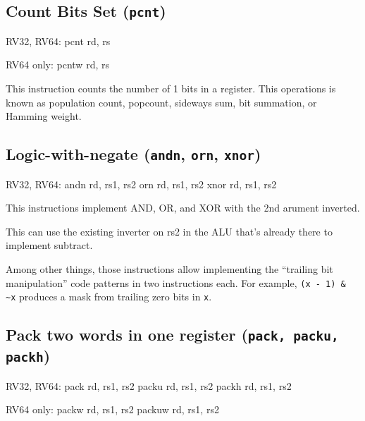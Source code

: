 
\subsection{Count Bits Set (\texttt{pcnt})}

\begin{rvb}
  RV32, RV64:
    pcnt rd, rs

  RV64 only:
    pcntw rd, rs
\end{rvb}

This instruction counts the number of 1 bits in a register. This operations is known as
population count, popcount, sideways sum, bit summation, or Hamming weight.~\cite{HammingWeight,Warren12}




\subsection{Logic-with-negate (\texttt{andn}, \texttt{orn}, \texttt{xnor})}

\begin{rvb}
  RV32, RV64:
    andn rd, rs1, rs2
    orn  rd, rs1, rs2
    xnor rd, rs1, rs2
\end{rvb}

This instructions implement AND, OR, and XOR with the 2nd arument inverted.



This can use the existing inverter on rs2 in the ALU that's already there to
implement subtract.

Among other things, those instructions allow implementing the ``trailing bit
manipulation'' code patterns in two instructions each. For example, {\tt (x -
1) \& \textasciitilde{}x} produces a mask from trailing zero bits in {\tt x}.


\subsection{Pack two words in one register (\texttt{pack, packu, packh})}

\begin{rvb}
  RV32, RV64:
    pack  rd, rs1, rs2
    packu rd, rs1, rs2
    packh rd, rs1, rs2

  RV64 only:
    packw  rd, rs1, rs2
    packuw rd, rs1, rs2
\end{rvb}

